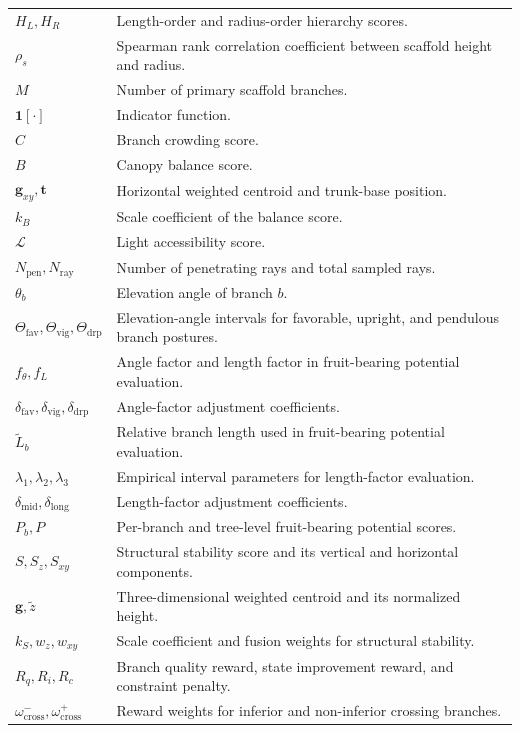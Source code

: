 \documentclass[12pt,a4paper,fontset=fandol]{ctexart}
\begin{document}
\begin{longtable}{>{\raggedright\arraybackslash}p{}
                  >{\raggedright\arraybackslash}p{}}
$H_L, H_R$ & Length-order and radius-order hierarchy scores. \\
$\rho_s$ & Spearman rank correlation coefficient between scaffold height and radius. \\
$M$ & Number of primary scaffold branches. \\
$\mathbf{1}[\cdot]$ & Indicator function. \\
$C$ & Branch crowding score. \\
$B$ & Canopy balance score. \\
$\mathbf{g}_{xy}, \mathbf{t}$ & Horizontal weighted centroid and trunk-base position. \\
$k_B$ & Scale coefficient of the balance score. \\
$\mathcal{L}$ & Light accessibility score. \\
$N_{\mathrm{pen}}, N_{\mathrm{ray}}$ & Number of penetrating rays and total sampled rays. \\
$\theta_b$ & Elevation angle of branch $b$. \\
$\Theta_{\mathrm{fav}}, \Theta_{\mathrm{vig}}, \Theta_{\mathrm{drp}}$ & Elevation-angle intervals for favorable, upright, and pendulous branch postures. \\
$f_\theta, f_L$ & Angle factor and length factor in fruit-bearing potential evaluation. \\
$\delta_{\mathrm{fav}}, \delta_{\mathrm{vig}}, \delta_{\mathrm{drp}}$ & Angle-factor adjustment coefficients. \\
$\tilde{L}_b$ & Relative branch length used in fruit-bearing potential evaluation. \\
$\lambda_1, \lambda_2, \lambda_3$ & Empirical interval parameters for length-factor evaluation. \\
$\delta_{\mathrm{mid}}, \delta_{\mathrm{long}}$ & Length-factor adjustment coefficients. \\
$P_b, P$ & Per-branch and tree-level fruit-bearing potential scores. \\
$S, S_z, S_{xy}$ & Structural stability score and its vertical and horizontal components. \\
$\mathbf{g}, \tilde{z}$ & Three-dimensional weighted centroid and its normalized height. \\
$k_S, w_z, w_{xy}$ & Scale coefficient and fusion weights for structural stability. \\
$R_q, R_i, R_c$ & Branch quality reward, state improvement reward, and constraint penalty. \\
$\omega_{\mathrm{cross}}^{-}, \omega_{\mathrm{cross}}^{+}$ & Reward weights for inferior and non-inferior crossing branches. \\

\end{longtable}
\end{document}
